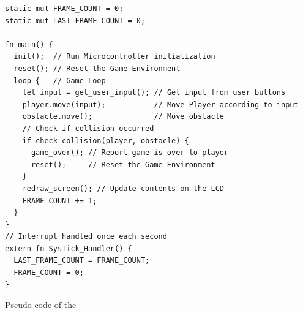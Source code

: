 \begin{listing}[H]
  \begin{verbatim}
static mut FRAME_COUNT = 0;
static mut LAST_FRAME_COUNT = 0;

fn main() {
  init();  // Run Microcontroller initialization
  reset(); // Reset the Game Environment
  loop {   // Game Loop
    let input = get_user_input(); // Get input from user buttons
    player.move(input);           // Move Player according to input
    obstacle.move();              // Move obstacle
    // Check if collision occurred
    if check_collision(player, obstacle) {
      game_over(); // Report game is over to player
      reset();     // Reset the Game Environment
    }
    redraw_screen(); // Update contents on the LCD
    FRAME_COUNT += 1;
  }
}
// Interrupt handled once each second
extern fn SysTick_Handler() {
  LAST_FRAME_COUNT = FRAME_COUNT;
  FRAME_COUNT = 0;
}
  \end{verbatim}
  \caption{Pseudo code of the {\cg}}
  \label{lst:game_loop}
\end{listing}
